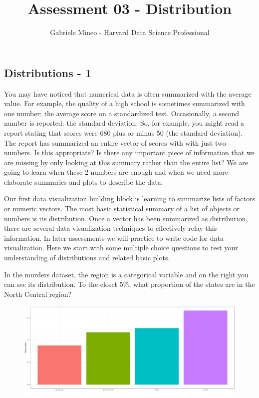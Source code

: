 \documentclass[]{article}
\title{Assessment 03 - Distribution}
\author{Gabriele Mineo - Harvard Data Science Professional}
\date{}
\begin{document}
\maketitle

\subsection{\texorpdfstring{\textbf{Distributions -
1}}{Distributions - 1}}\label{distributions---1}

You may have noticed that numerical data is often summarized with the
average value. For example, the quality of a high school is sometimes
summarized with one number: the average score on a standardized test.
Occasionally, a second number is reported: the standard deviation. So,
for example, you might read a report stating that scores were 680 plus
or minus 50 (the standard deviation). The report has summarized an
entire vector of scores with with just two numbers. Is this appropriate?
Is there any important piece of information that we are missing by only
looking at this summary rather than the entire list? We are going to
learn when these 2 numbers are enough and when we need more elaborate
summaries and plots to describe the data.

Our first data visualization building block is learning to summarize
lists of factors or numeric vectors. The most basic statistical summary
of a list of objects or numbers is its distribution. Once a vector has
been summarized as distribution, there are several data visualization
techniques to effectively relay this information. In later assessments
we will practice to write code for data visualization. Here we start
with some multiple choice questions to test your understanding of
distributions and related basic plots.

In the murders dataset, the region is a categorical variable and on the
right you can see its distribution. To the closet 5\%, what proportion
of the states are in the North Central region?

\begin{figure}
\centering
\includegraphics{img1.png}
\caption{}
\end{figure}
\end{document}
